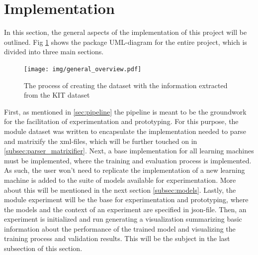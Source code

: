 	\section{Implementation}
		In this section, the general aspects of the implementation of this project will be outlined. Fig \ref{fig:overview} shows the package UML-diagram for the entire project, which is divided into three main sections.\newline
		\begin{figure}[H]
			\centering
			\texttt{[image: img/general\_overview.pdf]}
			\caption{The process of creating the dataset with the information extracted from the KIT dataset}
			\label{fig:overview}
		\end{figure}
		First, as mentioned in \ref{sec:pipeline} the pipeline is meant to be the groundwork for the facilitation of experimentation and prototyping. For this purpose, the module dataset was written to encapsulate the implementation needed to parse and matrixify the xml-files, which will be further touched on in \ref{subsec:parser_matrixifier}. Next, a base implementation for all learning machines must be implemented, where the training and evaluation process is implemented. As such, the user won't need to replicate the implementation of a new learning machine is added to the suite of models available for experimentation. More about this will be mentioned in the next section \ref{subsec:models}. Lastly, the module experiment will be the base for experimentation and prototyping, where the models and the context of an experiment are specified in json-file. Then, an experiment is initialized and run generating a visualization summarizing basic information about the performance of the trained model and visualizing the training process and validation results. This will be the subject in the last subsection of this section.
